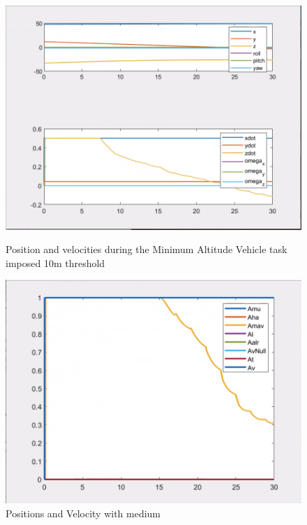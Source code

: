 \documentclass{article}
\begin{document}
\begin{figure}[htpb] 
\begin{minipage}{0.40\textwidth}  
\includegraphics[width=\textwidth]{123_5m_ppdot.png}
\caption{Position and velocities during the Minimum Altitude Vehicle task imposed 10m threshold}\label{5m_ppdot} 
\end{minipage}  
\hspace{0.2\textwidth} 
\begin{minipage}{0.43\textwidth}  
\includegraphics[width=\textwidth]{123_5m_A.png}
\caption{Positions and Velocity with medium}\label{5m_A} 
\end{minipage} 
\end{figure}
\end{document}
